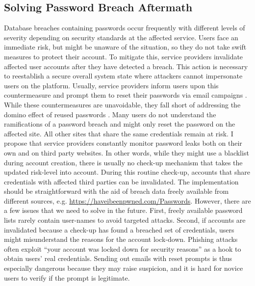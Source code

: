\subsection{Solving Password Breach Aftermath}
Database breaches containing passwords occur frequently with different levels of severity depending on security standards at the affected service. 
Users face an immediate risk, but might be unaware of the situation, so they do not take swift measures to protect their account. 
To mitigate this, service providers invalidate affected user accounts after they have detected a breach. This action is necessary to reestablish a secure overall system state where attackers cannot impersonate users on the platform. Usually, service providers inform users upon this countermeasure and prompt them to reset their passwords via email campaigns \cite{Huh2017TooBusy}. 
While these countermeasures are unavoidable, they fall short of addressing the domino effect of reused passwords \cite{Ives2004DominoEffectReuse}. Many users do not understand the ramifications of a password breach and might only reset the password on the affected site. All other sites that share the same credentials remain at risk. 
I propose that service providers constantly monitor password leaks both on their own and on third party websites. In other words, while they might use a blacklist during account creation, there is usually no check-up mechanism that takes the updated risk-level into account. During this routine check-up, accounts that share credentials with affected third parties can be invalidated. The implementation should be straightforward with the aid of breach data freely available from different sources, e.g. \url{https://haveibeenpwned.com/Passwords}. 
However, there are a few issues that we need to solve in the future. First, freely available password lists rarely contain user-names to avoid targeted attacks. Second, if accounts are invalidated because a check-up has found a breached set of credentials, users might misunderstand the reasons for the account lock-down. Phishing attacks often exploit ``your account was locked down for security reasons'' as a hook to obtain users' real credentials. Sending out emails with reset prompts is thus especially dangerous because they may raise suspicion, and it is hard for novice users to verify if the prompt is legitimate.

